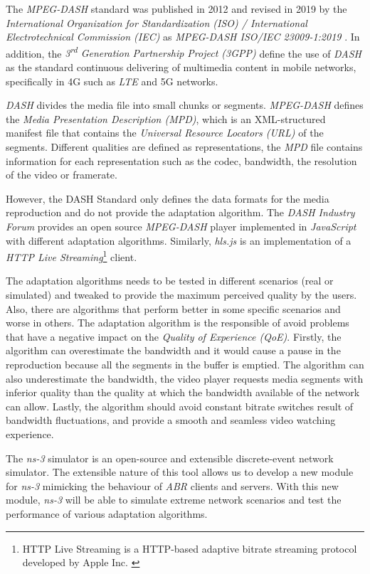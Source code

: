 The \textit{MPEG-DASH} standard was published in 2012 and revised in 2019 
by the \textit{International Organization for Standardization (ISO) / International 
Electrotechnical Commission (IEC)} as \textit{MPEG-DASH ISO/IEC 23009-1:2019}
\cite{ISO23009}. In addition, the \textit{3\textsuperscript{rd} Generation Partnership Project (3GPP)}
define the use of \textit{DASH} as the standard continuous delivering of multimedia
content in mobile networks, specifically in 4G such as \textit{LTE} and 5G networks.

\textit{DASH} divides the media file into small chunks or segments.
\textit{MPEG-DASH} defines the \textit{Media Presentation Description (MPD)}, 
which is an XML-structured manifest file that contains the \textit{Universal Resource 
Locators (URL)} of the segments. Different qualities are defined as representations,
the \textit{MPD} file contains information for each representation such as the
codec, bandwidth, the resolution of the video or framerate.

However, the DASH Standard \cite{ISO23009} only defines the data formats
for the media reproduction and do not provide the adaptation algorithm.
The \textit{DASH Industry Forum} \cite{dash2} provides an open source \textit{MPEG-DASH} 
player implemented in \textit{JavaScript} with different adaptation algorithms.
Similarly, \textit{hls.js} is an implementation of a \textit{HTTP Live Streaming}\footnote{HTTP
Live Streaming is a HTTP-based adaptive bitrate streaming protocol developed by Apple Inc.
 \cite{hls1}} client.

The adaptation algorithms needs to be tested in different scenarios (real or simulated)
and tweaked to provide the maximum perceived quality by the users. Also, there are
algorithms that perform better in some specific scenarios and worse in others. The adaptation
algorithm is the responsible of avoid problems that have a negative impact
on the \textit{Quality of Experience (QoE)}. Firstly, the algorithm can overestimate
the bandwidth and it would cause a pause in the reproduction because all the 
segments in the buffer is emptied. The algorithm can also underestimate the bandwidth,
the video player requests media segments with inferior quality than the quality at which the 
bandwidth available of the network can allow. Lastly, the algorithm should avoid
constant bitrate switches result of bandwidth fluctuations, and provide a smooth and
seamless video watching experience.

The \textit{ns-3} simulator is an open-source and extensible discrete-event network simulator. 
The extensible nature of this tool allows us to develop a new module for \textit{ns-3}
mimicking the behaviour of \textit{ABR} clients and servers. With this new module, \textit{ns-3} 
will be able to simulate extreme network scenarios and test the performance of 
various adaptation algorithms.

